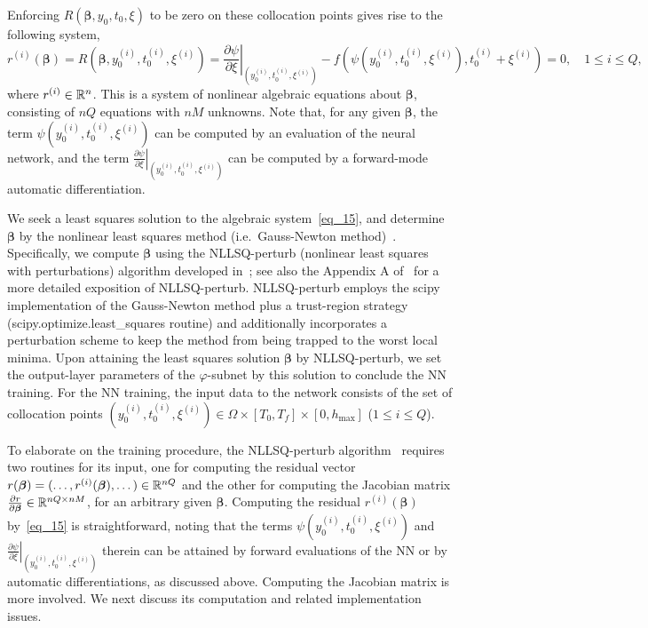 Enforcing $R(\bm\beta,y_0,t_0,\xi)$ to be zero on these collocation points
gives rise to the following system,
\begin{equation}\label{eq_15}
  r^{(i)}(\bm\beta) = R(\bm\beta, y_0^{(i)},t_0^{(i)},\xi^{(i)})
  = \left.\frac{\partial\psi}{\partial \xi}\right|_{(y_0^{(i)},t_0^{(i)},\xi^{(i)})}
  -f(\psi(y_0^{(i)},t_0^{(i)},\xi^{(i)}),t_0^{(i)}+\xi^{(i)}) = 0,
  \quad 1\leqslant i\leqslant Q,
\end{equation}
where $r^{(i)}\in\mathbb{R}^n$.
This is a system of nonlinear algebraic equations about $\bm\beta$,
consisting of $nQ$ equations with $nM$ unknowns.
Note that, for any given $\bm\beta$,
the term $\psi(y_0^{(i)},t_0^{(i)},\xi^{(i)})$ can be computed by
an evaluation of the neural network, and
the term $\left.\frac{\partial\psi}{\partial \xi}\right|_{(y_0^{(i)},t_0^{(i)},\xi^{(i)})}$
can be computed by a forward-mode automatic differentiation.


We seek a least squares solution  to the
algebraic system~\eqref{eq_15}, and determine $\bm\beta$
by the nonlinear least squares method (i.e.~Gauss-Newton
method)~\cite{Bjorck1996,Bjorck2015}.
Specifically, we compute $\bm\beta$ using the NLLSQ-perturb
(nonlinear least squares
with perturbations) algorithm developed in~\cite{DongL2021};
see also the Appendix A of~\cite{DongW2023} for a more detailed exposition
of NLLSQ-perturb. NLLSQ-perturb
employs the scipy implementation of the Gauss-Newton
method plus a trust-region strategy (scipy.optimize.least\_squares
routine) and additionally incorporates a perturbation scheme
to keep the method from being trapped to the worst local minima.
Upon attaining the least squares solution $\bm\beta$ by NLLSQ-perturb,
we set the output-layer parameters of the $\varphi$-subnet by this solution
to conclude the NN training.
For the NN training,
the input data to the network  consists of the set of collocation
points $(y_0^{(i)},t_0^{(i)},\xi^{(i)})\in \Omega\times[T_0,T_f]\times[0,h_{\max}]$
($1\leqslant i\leqslant Q$).

To elaborate on the training procedure,
the NLLSQ-perturb algorithm~\cite{DongL2021,DongW2023} requires two routines
for its input, one for computing the residual vector
$r(\bm\beta) = (\dots,r^{(i)}(\bm\beta),\dots)\in\mathbb{R}^{nQ}$ and
the other for computing
the Jacobian matrix
$\frac{\partial r}{\partial\bm\beta}\in\mathbb{R}^{nQ\times nM}$,
for an arbitrary given $\bm\beta$.
Computing the residual $r^{(i)}(\bm\beta)$ by~\eqref{eq_15} is straightforward,
noting that the terms $\psi(y_0^{(i)},t_0^{(i)},\xi^{(i)})$ and
$\left.\frac{\partial\psi}{\partial \xi}\right|_{(y_0^{(i)},t_0^{(i)},\xi^{(i)})}$ therein can be
attained by forward evaluations of the NN  or by automatic
differentiations, as discussed above.
Computing the Jacobian matrix is more involved.
We next discuss its computation and 
related implementation issues.

